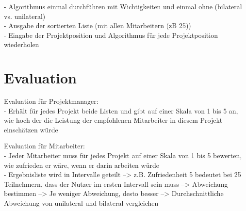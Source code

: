 - Algorithmus einmal durchführen mit Wichtigkeiten und einmal ohne (bilateral vs. unilateral)\\
- Ausgabe der sortierten Liste (mit allen Mitarbeitern (zB 25))\\
- Eingabe der Projektposition und Algorithmus für jede Projektposition wiederholen

\section{Evaluation}
\label{ch:methodik:evaluation}
Evaluation für Projektmanager:\\
- Erhält für jedes Projekt beide Listen und gibt auf einer Skala von 1 bis 5 an, wie hoch der die Leistung der empfohlenen Mitarbeiter in diesem Projekt einschätzen würde

Evaluation für Mitarbeiter:\\
- Jeder Mitarbeiter muss für jedes Projekt auf einer Skala von 1 bis 5 bewerten, wie zufrieden er wäre, wenn er darin arbeiten würde\\
- Ergebnisliste wird in Intervalle geteilt --> z.B. Zufriedenheit 5 bedeutet bei 25 Teilnehmern, dass der Nutzer im ersten Intervall sein muss --> Abweichung bestimmen --> Je weniger Abweichung, desto besser --> Durchschnittliche Abweichung von unilateral und bilateral vergleichen
